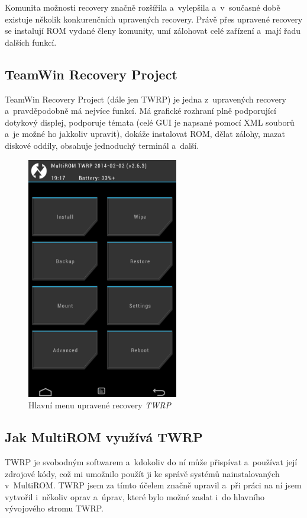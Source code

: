 \documentclass[12pt, a4paper, oneside]{article}
\newcommand{\It}{\textit}  %
\begin{document}
Komunita možnosti recovery značně rozšířila a~vylepšila a~v~současné době existuje několik konkurenčních upravených recovery. Právě přes upravené recovery se instalují ROM vydané členy komunity, umí zálohovat celé zařízení a~mají řadu dalších funkcí.

\subsection{TeamWin Recovery Project}
TeamWin Recovery Project\cite{twrp} (dále jen TWRP) je jedna z~upravených recovery a~pravděpodobně má nejvíce funkcí. Má grafické rozhraní plně podporující dotykový displej, podporuje témata (celé GUI je napsané pomocí XML souborů a~je možné ho jakkoliv upravit), dokáže instalovat ROM, dělat zálohy, mazat diskové oddíly, obsahuje jednoduchý terminál a~další.

\begin{figure}[H]
\begin{center}
 \includegraphics[width=250px]{img/recovery.png}
\caption{Hlavní menu upravené recovery \It{TWRP}}
\end{center}
\end{figure}


\subsection{Jak MultiROM využívá TWRP}
TWRP je svobodným softwarem a~kdokoliv do ní může přispívat a~používat její zdrojové kódy, což mi umožnilo použít ji ke správě systémů nainstalovaných v~MultiROM. TWRP jsem za tímto účelem značně upravil a~při práci na ní jsem vytvořil i~několiv oprav a~úprav, které bylo možné zaslat i~do hlavního vývojového stromu TWRP.
\end{document}
